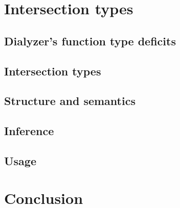 \documentclass{beamer}
\begin{document}
\section{Intersection types}

\subsection{Dialyzer's function type deficits}
\subsection{Intersection types}
\subsection{Structure and semantics}
\subsection{Inference}
\subsection{Usage}

\section{Conclusion}
\end{document}
